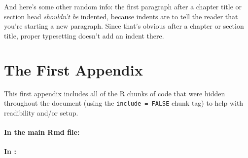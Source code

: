 \documentclass[12pt,twoside]{amherstthesis}
\begin{document}
  And here's some other random info: the first paragraph after a chapter
  title or section head \emph{shouldn't be} indented, because indents are
  to tell the reader that you're starting a new paragraph. Since that's
  obvious after a chapter or section title, proper typesetting doesn't add
  an indent there.
  
  \appendix
  
  \singlespacing
  
  \chapter{The First Appendix}\label{the-first-appendix}
  
  This first appendix includes all of the R chunks of code that were
  hidden throughout the document (using the \texttt{include\ =\ FALSE}
  chunk tag) to help with readibility and/or setup.
  
  \subsubsection{In the main Rmd file:}\label{in-the-main-rmd-file}
  
  \begin{Shaded}
  \begin{Highlighting}[]
  \NormalTok{(}\OperatorTok{!}
    \NormalTok{(}\NormalTok{, } \NormalTok{)}
  \NormalTok{(}\OperatorTok{!}
  \OperatorTok{::}\NormalTok{(}\NormalTok{)}
  \NormalTok{\}}
  \end{Highlighting}
  \end{Shaded}
  
  \subsubsection{\texorpdfstring{In
  \protect\hyperlink{ref_labels}{}:}{In :}}\label{in}
  
\end{document}
